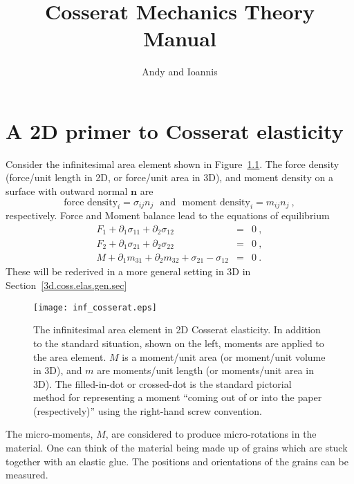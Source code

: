 \documentclass[]{scrreprt}
\newcommand{\si}{\sigma}
\newcommand{\mand}{\ \ \ \mbox{and}\ \ \ }
\newcommand{\pl}{\partial}
\begin{document}
\title{Cosserat Mechanics Theory Manual}
\author{Andy and Ioannis}
\maketitle

\tableofcontents

\chapter{A 2D primer to Cosserat elasticity}

Consider the infinitesimal area element shown in
Figure~\ref{inf_cosserat.fig}.  The force density (force/unit length
in 2D, or force/unit area in 3D), and moment density on a surface with
outward normal ${\mathbf n}$ are
$$
\mbox{force density}_{i} = \si_{ij}n_{j} \mand
\mbox{moment density}_{i} = m_{ij}n_{j} \ ,
$$
respectively.  Force and Moment balance lead to the
equations of equilibrium
\begin{eqnarray*}
F_{1} + \pl_{1}\si_{11} + \pl_{2}\si_{12} & = & 0 \ ,\\
F_{2} + \pl_{1}\si_{21} + \pl_{2}\si_{22} & = & 0 \ ,\\
M + \pl_{1}m_{31} + \pl_{2}m_{32} + \si_{21}-\si_{12} & = & 0 \ .
\end{eqnarray*}
These will be rederived in a more general setting in 3D in Section~\ref{3d.coss.elas.gen.sec}

\begin{figure}[htb]
\begin{center}
\texttt{[image: inf\_cosserat.eps]}
\caption{The infinitesimal area element in 2D Cosserat elasticity.
  In addition to the standard situation, shown on the left, moments
  are applied to the area element.  $M$ is a moment/unit area (or
  moment/unit volume in 3D), and $m$ are moments/unit length (or
  moments/unit area in 3D).  The filled-in-dot or crossed-dot
  is the standard pictorial method for representing a moment ``coming
  out of or into the paper (respectively)'' using the right-hand screw
  convention.} 
\label{inf_cosserat.fig}
\end{center}
\end{figure}

The micro-moments, $M$, are considered to produce micro-rotations in
the material.  One can think of the material being made up of grains
which are stuck together with an elastic glue.  The positions and
orientations of the grains can be measured.
\end{document}
